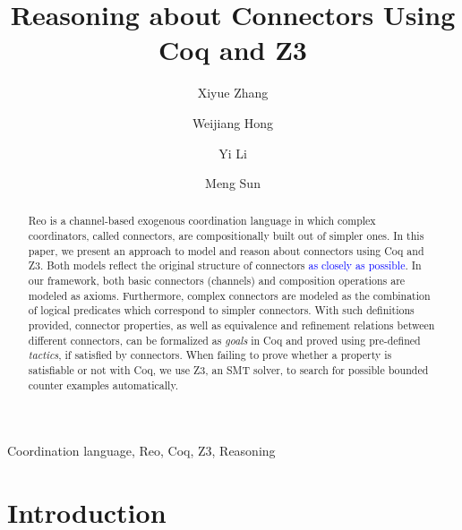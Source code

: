\documentclass[preprint,3p]{elsarticle}
\newcommand{\liyi}[1]{\textcolor{blue}{#1}}
\newcommand{\xy}[1]{{#1}}
\begin{document}
\begin{frontmatter}

\title{Reasoning about Connectors Using Coq and Z3}


\author{Xiyue Zhang}
\author{Weijiang Hong}
\author{Yi Li}
\author{Meng Sun}
\address{LMAM \& DI, School of Mathematical Science, Peking University, Beijing, China}

\begin{abstract}
Reo is a channel-based exogenous coordination language in which complex coordinators, called connectors, are compositionally built out of simpler ones. In this paper, we present an approach to model and reason about connectors using Coq and Z3.
Both models reflect the original structure of connectors \liyi{as closely as possible}. In our framework, both basic connectors (channels) and composition operations are \xy{modeled as axioms.} Furthermore, complex connectors are modeled as the combination of logical predicates which correspond to simpler connectors. With such definitions provided, connector properties, as well as equivalence and refinement relations between different connectors, can be formalized as \emph{goals} in Coq and proved using pre-defined \emph{tactics}, if satisfied by connectors. \xy{When failing to prove whether a property is satisfiable or not with Coq, we use Z3, an SMT solver, to search for possible bounded counter examples automatically.}

\end{abstract}
\begin{keyword}
Coordination language, Reo, Coq, Z3, Reasoning
\end{keyword}
\end{frontmatter}
\section{Introduction}\label{sec:introduction}
\end{document}

